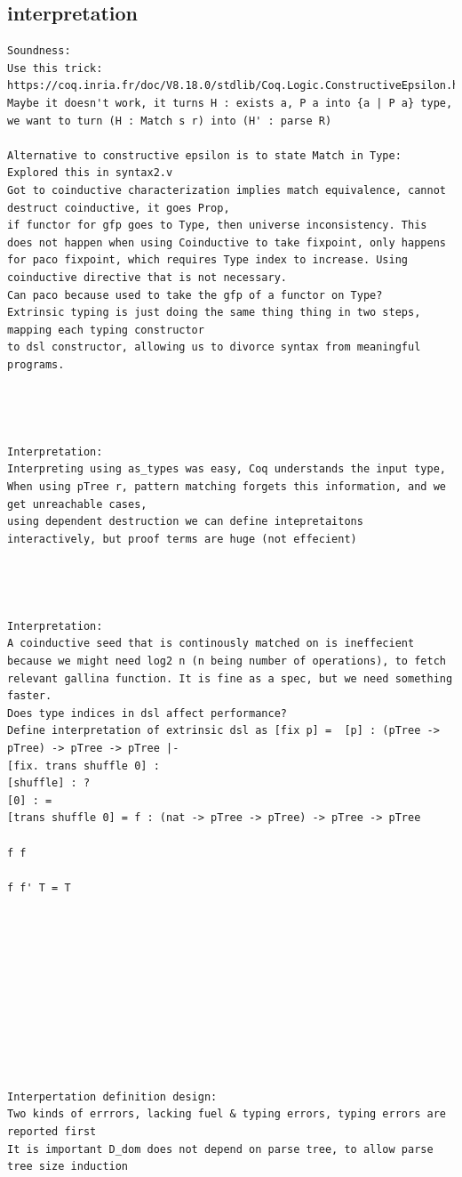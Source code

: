 \documentclass[a4paper,UKenglish,cleveref, autoref, thm-restate]{lipics-v2021}
\begin{document}
\subsection{interpretation}
\begin{verbatim}
Soundness:
Use this trick: https://coq.inria.fr/doc/V8.18.0/stdlib/Coq.Logic.ConstructiveEpsilon.html
Maybe it doesn't work, it turns H : exists a, P a into {a | P a} type, we want to turn (H : Match s r) into (H' : parse R)

Alternative to constructive epsilon is to state Match in Type:
Explored this in syntax2.v
Got to coinductive characterization implies match equivalence, cannot destruct coinductive, it goes Prop,
if functor for gfp goes to Type, then universe inconsistency. This does not happen when using Coinductive to take fixpoint, only happens for paco fixpoint, which requires Type index to increase. Using coinductive directive that is not necessary. 
Can paco because used to take the gfp of a functor on Type?
Extrinsic typing is just doing the same thing thing in two steps, mapping each typing constructor 
to dsl constructor, allowing us to divorce syntax from meaningful programs.




Interpretation:
Interpreting using as_types was easy, Coq understands the input type,
When using pTree r, pattern matching forgets this information, and we get unreachable cases,
using dependent destruction we can define intepretaitons interactively, but proof terms are huge (not effecient)




Interpretation:
A coinductive seed that is continously matched on is ineffecient because we might need log2 n (n being number of operations), to fetch relevant gallina function. It is fine as a spec, but we need something faster.
Does type indices in dsl affect performance?
Define interpretation of extrinsic dsl as [fix p] =  [p] : (pTree -> pTree) -> pTree -> pTree |- 
[fix. trans shuffle 0] : 
[shuffle] : ?
[0] : =
[trans shuffle 0] = f : (nat -> pTree -> pTree) -> pTree -> pTree 

f f

f f' T = T











Interpertation definition design:
Two kinds of errrors, lacking fuel & typing errors, typing errors are reported first
It is important D_dom does not depend on parse tree, to allow parse tree size induction


\end{verbatim}
\end{document}
